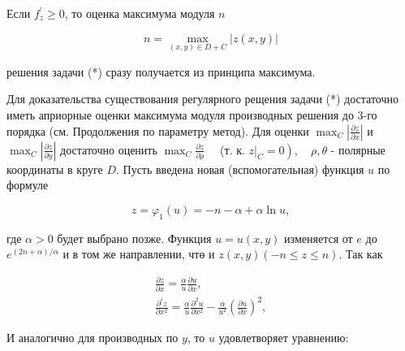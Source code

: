 \documentclass[10pt]{article}
\begin{document}
Если $f_{z}^{\prime} \geqslant 0$, то оценка максимума модуля $n$



\[

n=\max _{(x, y) \in D+C}|z(x, y)|

\]



решения задачи (*) сразу получается из принципа максимума.



Для доказательства существования регулярного рещения задачи (*) достаточно иметь априорные оценки максимума модуля производных решения до 3-го порядка (см. Продолжения по параметру метод). Для оценки $\max _{C}\left|\frac{\partial z}{\partial x}\right|$ и $\max _{C}\left|\frac{\partial z}{\partial y}\right|$ достаточно оценить $\max _{C} \frac{\partial z}{\partial \rho} \quad$ (т. к. $\left.\left.z\right|_{C}=0\right), \quad \rho, \theta$ - полярные координаты в круге $D$. Пусть введена новая (вспомогательная) функция $u$ по формуле



\[

z=\varphi_{1}(u)=-n-\alpha+\alpha \ln u,

\]



где $\alpha>0$ будет выбрано позже. Функция $u=u(x, y)$ изменяется от $e$ до $e^{(2 n+\alpha) / \alpha}$ и в том же направлении, чтө и $z(x, y)(-n \leqslant z \leqslant n)$. Так как



\[

\begin{gathered}

\frac{\partial z}{\partial x}=\frac{\alpha}{u} \frac{\partial u}{\partial x}, \\

\frac{\partial^{i} z}{\partial x^{2}}=\frac{\alpha}{u} \frac{\partial^{2} u}{\partial x^{2}}-\frac{\alpha}{u^{2}}\left(\frac{\partial u}{\partial x}\right)^{2},

\end{gathered}

\]



И аналогично для производных по $y$, то $u$ удовлетворяет уравнению:
\end{document}

